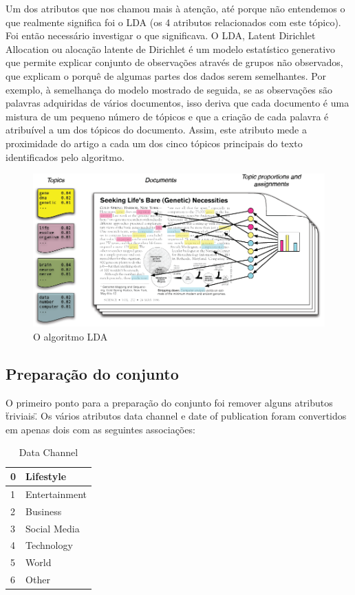 Um dos atributos que nos chamou mais à atenção, até porque não entendemos o que realmente significa foi o LDA (os 4 atributos relacionados com este tópico). Foi então necessário investigar o que significava. O LDA, Latent Dirichlet Allocation ou alocação latente de Dirichlet é um modelo estatístico generativo que permite explicar conjunto de observações através de grupos não observados, que explicam o porquê de algumas partes dos dados serem semelhantes.
Por exemplo, à semelhança do modelo mostrado de seguida, se as observações são palavras adquiridas de vários documentos, isso deriva que cada documento é uma mistura de um pequeno número de tópicos e que a criação de cada palavra é atribuível a um dos tópicos do documento.\newline
Assim, este atributo mede a proximidade do artigo a cada um dos cinco tópicos principais do texto identificados pelo algoritmo.

\begin{figure}[H]
    \centering
    \includegraphics[scale=0.3]{tex/img/lda.png}
    \caption{O algoritmo LDA}
    \label{fig:LDAOn}
\end{figure}


\subsection{Preparação do conjunto}

O primeiro ponto para a preparação do conjunto foi remover alguns atributos \"triviais\". Os vários atributos data channel e date of publication foram convertidos em apenas dois com as seguintes associações:


\begin{table}[]
\centering
\label{my-labelOn}
\caption{Data Channel}
\begin{tabular}{|l|l|}
\hline
0 & Lifestyle     \\ \hline
1 & Entertainment \\ \hline
2 & Business      \\ \hline
3 & Social Media  \\ \hline
4 & Technology    \\ \hline
5 & World         \\ \hline
6 & Other         \\ \hline
\end{tabular}
\end{table}

